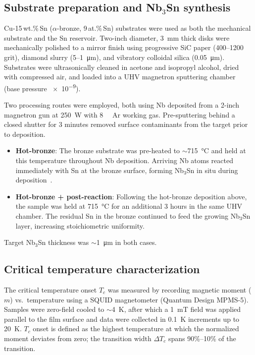 \documentclass{iopjournal}
\begin{document}
\subsection{Substrate preparation and Nb$_3$Sn synthesis}

Cu-15\,wt.\%\,Sn ($\alpha$-bronze, 9\,at.\%\,Sn) substrates were used as both the mechanical substrate and the Sn reservoir. Two-inch diameter, \qty{3}{\milli\meter} thick disks were mechanically polished to a mirror finish using progressive SiC paper (400--1200 grit), diamond slurry (5--\qty{1}{\micro\meter}), and vibratory colloidal silica (\qty{0.05}{\micro\meter}). Substrates were ultrasonically cleaned in acetone and isopropyl alcohol, dried with compressed air, and loaded into a UHV magnetron sputtering chamber (base pressure \qty{e-9}{\torr}).

Two processing routes were employed, both using Nb deposited from a 2-inch magnetron gun at \qty{250}{\watt} with \qty{8}{\milli\torr} Ar working gas. Pre-sputtering behind a closed shutter for 3 minutes removed surface contaminants from the target prior to deposition.

\begin{itemize}
    \item \textbf{Hot-bronze}: The bronze substrate was pre-heated to $\sim$\qty{715}{\degreeCelsius} and held at this temperature throughout Nb deposition. Arriving Nb atoms reacted immediately with Sn at the bronze surface, forming Nb$_3$Sn in situ during deposition~\cite{withanageRapidNbSn2021}.

    \item \textbf{Hot-bronze + post-reaction}: Following the hot-bronze deposition above, the sample was held at \qty{715}{\degreeCelsius} for an additional 3 hours in the same UHV chamber. The residual Sn in the bronze continued to feed the growing Nb$_3$Sn layer, increasing stoichiometric uniformity.
\end{itemize}

Target Nb$_3$Sn thickness was $\sim$\qty{1}{\micro\meter} in both cases.

\subsection{Critical temperature characterization}

The critical temperature onset $T_c$ was measured by recording magnetic moment ($m$) vs.\ temperature using a SQUID magnetometer (Quantum Design MPMS-5). Samples were zero-field cooled to $\sim$\qty{4}{\kelvin}, after which a \qty{1}{\milli\tesla} field was applied parallel to the film surface and data were collected in \qty{0.1}{\kelvin} increments up to \qty{20}{\kelvin}. $T_c$ onset is defined as the highest temperature at which the normalized moment deviates from zero; the transition width $\Delta T_c$ spans 90\%--10\% of the transition.
\end{document}
